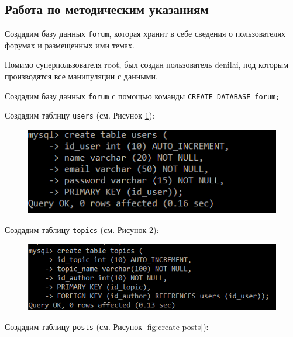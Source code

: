 \documentclass[a4paper,14pt]{extarticle}
\newcommand{\methodsection}{Работа по методическим указаниям~}
\begin{document}
\subsection{\methodsection}
Создадим базу данных \texttt{forum}, которая хранит в себе сведения о пользователях форумах и размещенных ими темах.

Помимо суперпользователя root, был создан пользователь denilai, под которым производятся все манипуляции с данными.

Создадим базу данных \texttt{forum} с помощью команды \texttt{CREATE DATABASE forum;}


Создадим таблицу \texttt{users} (см. Рисунок \ref{fig:create-users}):

\begin{figure}[h!]
	\centering
	\includegraphics[width=0.6\linewidth]{images/create-users}
	\caption{}
	\label{fig:create-users}
\end{figure}


Создадим таблицу \texttt{topics} (см. Рисунок \ref{fig:create-topics}):

\begin{figure}[h!]
	\centering
	\includegraphics[width=0.6\linewidth]{images/create-topics}
	\caption{}
	\label{fig:create-topics}
\end{figure}

Создадим таблицу \texttt{posts} (см. Рисунок \ref{fig:create-posts}):
\end{document}
